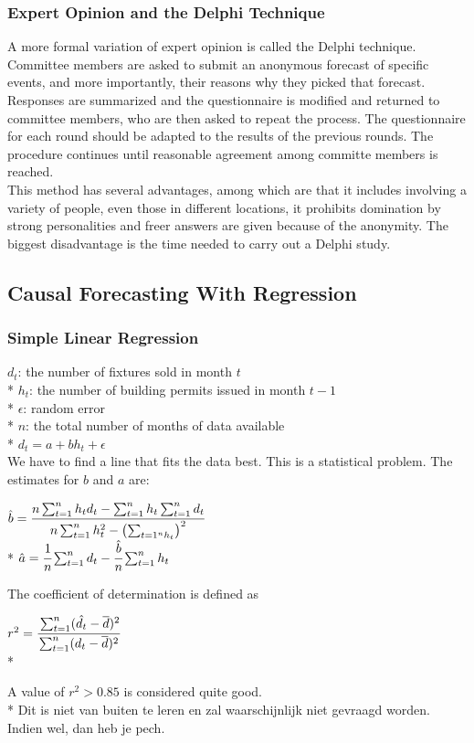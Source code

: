 \documentclass[12pt]{article}
\begin{document}
\subsubsection{Expert Opinion and the Delphi Technique}
A more formal variation of expert opinion is called the Delphi technique. Committee members are asked to submit an anonymous forecast of specific events, and more importantly, their reasons why they picked that forecast. Responses are summarized and the questionnaire is modified and returned to committee members, who are then asked to repeat the process. The questionnaire for each round should be adapted to the results of the previous rounds.  The procedure continues until reasonable agreement among committe members is reached.\\
This method has several advantages, among which are that it includes involving a variety of people, even those in different locations, it prohibits domination by strong personalities and freer answers are given because of the anonymity. The biggest disadvantage is the time needed to carry out a Delphi study.
\subsection{Causal Forecasting With Regression}
\subsubsection{Simple Linear Regression}
$d_t$: the number of fixtures sold in month $t$\\*
$h_t$: the number of building permits issued in month $t - 1$\\*
$\epsilon$: random error\\*
$n$: the total number of months of data available\\*
$d_t = a + bh_t + \epsilon$\\
We have to find a line that fits the data best. This is a statistical problem. The estimates for $b$ and $a$ are:
\begin{center}
$\hat{b} = \cfrac{n\sum_{t = 1}^nh_td_t - \sum_{t = 1}^{n}h_t\sum_{t = 1}^{n}d_t}{n\sum_{t = 1}^{n}h_t^2 - \left(\sum_{t = 1^nh_t}\right)^2}$\\*
$\hat{a} = \cfrac{1}{n}\sum_{t = 1}^{n}d_t - \cfrac{\hat{b}}{n}\sum_{t = 1}^{n}h_t$
\end{center}
The coefficient of determination is defined as
\begin{center}
$r^2 = \cfrac{\sum_{t = 1}^{n}(\hat{d_t}-\overline{d})^2}{\sum_{t = 1}^{n}(d_t - \overline{d})^2}$\\*
\end{center}
A value of $r^2 > 0.85$ is considered quite good.\\*
Dit is niet van buiten te leren en zal waarschijnlijk niet gevraagd worden. Indien wel, dan heb je pech.
\end{document}
